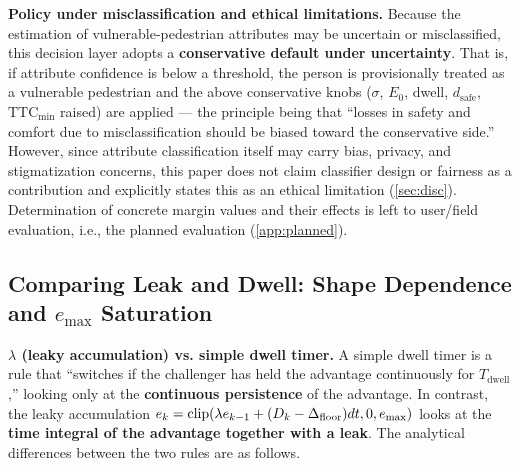\noindent\textbf{Policy under misclassification and ethical limitations.} Because the estimation of vulnerable-pedestrian attributes may be uncertain or misclassified, this decision layer adopts a \textbf{conservative default under uncertainty}. That is, if attribute confidence is below a threshold, the person is provisionally treated as a vulnerable pedestrian and the above conservative knobs ($\sigma$, $E_0$, dwell, $d_{\text{safe}}$, $\text{TTC}_{\min}$ raised) are applied --- the principle being that ``losses in safety and comfort due to misclassification should be biased toward the conservative side.'' However, since attribute classification itself may carry bias, privacy, and stigmatization concerns, this paper does not claim classifier design or fairness as a contribution and explicitly states this as an ethical limitation (\cref{sec:disc}). Determination of concrete margin values and their effects is left to user/field evaluation, i.e., the planned evaluation (\cref{app:planned}).


\subsection{Comparing Leak and Dwell: Shape Dependence and \texorpdfstring{$e_{\max}$}{e-max} Saturation}\label{subsec:leak}

\noindent\textbf{$\lambda$ (leaky accumulation) vs. simple dwell timer.} A simple dwell timer is a rule that ``switches if the challenger has held the advantage continuously for $T_{\text{dwell}}$,'' looking only at the \textbf{continuous persistence} of the advantage. In contrast, the leaky accumulation $e_k = \mathrm{clip}(\lambda e_{k-1} + (D_k - \Delta_{\text{floor}})dt, 0, e_{\max})$ looks at the \textbf{time integral of the advantage together with a leak}. The analytical differences between the two rules are as follows.

